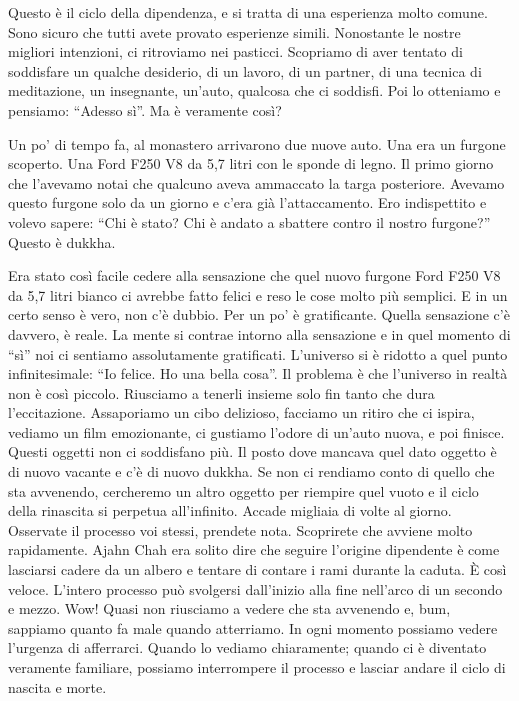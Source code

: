 Questo è il ciclo della dipendenza, e si tratta di una esperienza molto comune. Sono sicuro che tutti avete provato esperienze simili. Nonostante le nostre migliori intenzioni, ci ritroviamo nei pasticci. Scopriamo di aver tentato di soddisfare un qualche desiderio, di un lavoro, di un partner, di una tecnica di meditazione, un insegnante, un'auto, qualcosa che ci soddisfi. Poi lo otteniamo e pensiamo: ``Adesso sì''. Ma è veramente così?

Un po' di tempo fa, al monastero arrivarono due nuove auto. Una era un furgone scoperto. Una Ford F250 V8 da 5,7 litri con le sponde di legno. Il primo giorno che l'avevamo notai che qualcuno aveva ammaccato la targa posteriore. Avevamo questo furgone solo da un giorno e c'era già l'attaccamento. Ero indispettito e volevo sapere: ``Chi è stato? Chi è andato a sbattere contro il nostro furgone?'' Questo è dukkha.

Era stato così facile cedere alla sensazione che quel nuovo furgone Ford F250 V8 da 5,7 litri bianco ci avrebbe fatto felici e reso le cose molto più semplici. E in un certo senso è vero, non c'è dubbio. Per un po' è gratificante. Quella sensazione c'è davvero, è reale. La mente si contrae intorno alla sensazione e in quel momento di ``sì'' noi ci sentiamo assolutamente gratificati. L'universo si è ridotto a quel punto infinitesimale: ``Io felice. Ho una bella cosa''. Il problema è che l'universo in realtà non è così piccolo. Riusciamo a tenerli insieme solo fin tanto che dura l'eccitazione. Assaporiamo un cibo delizioso, facciamo un ritiro che ci ispira, vediamo un film emozionante, ci gustiamo l'odore di un'auto nuova, e poi finisce. Questi oggetti non ci soddisfano più. Il posto dove mancava quel dato oggetto è di nuovo vacante e c'è di nuovo dukkha. Se non ci rendiamo conto di quello che sta avvenendo, cercheremo un altro oggetto per riempire quel vuoto e il ciclo della rinascita si perpetua all'infinito. Accade migliaia di volte al giorno. Osservate il processo voi stessi, prendete nota. Scoprirete che avviene molto rapidamente. Ajahn Chah era solito dire che seguire l'origine dipendente è come lasciarsi cadere da un albero e tentare di contare i rami durante la caduta. È così veloce. L'intero processo può svolgersi dall'inizio alla fine nell'arco di un secondo e mezzo. Wow! Quasi non riusciamo a vedere che sta avvenendo e, bum, sappiamo quanto fa male quando atterriamo. In ogni momento possiamo vedere l'urgenza di afferrarci. Quando lo vediamo chiaramente; quando ci è diventato veramente familiare, possiamo interrompere il processo e lasciar andare il ciclo di nascita e morte.

